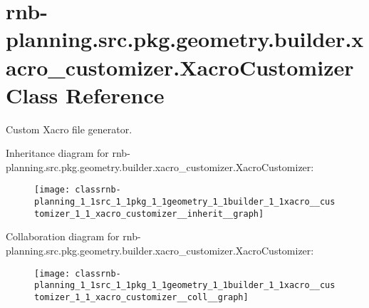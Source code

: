 \hypertarget{classrnb-planning_1_1src_1_1pkg_1_1geometry_1_1builder_1_1xacro__customizer_1_1_xacro_customizer}{}\section{rnb-\/planning.src.\+pkg.\+geometry.\+builder.\+xacro\+\_\+customizer.\+Xacro\+Customizer Class Reference}
\label{classrnb-planning_1_1src_1_1pkg_1_1geometry_1_1builder_1_1xacro__customizer_1_1_xacro_customizer}


Custom Xacro file generator.  




Inheritance diagram for rnb-\/planning.src.\+pkg.\+geometry.\+builder.\+xacro\+\_\+customizer.\+Xacro\+Customizer\+:
\nopagebreak
\begin{figure}[H]
\begin{center}
\leavevmode
\texttt{[image: classrnb-planning\_1\_1src\_1\_1pkg\_1\_1geometry\_1\_1builder\_1\_1xacro\_\_customizer\_1\_1\_xacro\_customizer\_\_inherit\_\_graph]}
\end{center}
\end{figure}


Collaboration diagram for rnb-\/planning.src.\+pkg.\+geometry.\+builder.\+xacro\+\_\+customizer.\+Xacro\+Customizer\+:
\nopagebreak
\begin{figure}[H]
\begin{center}
\leavevmode
\texttt{[image: classrnb-planning\_1\_1src\_1\_1pkg\_1\_1geometry\_1\_1builder\_1\_1xacro\_\_customizer\_1\_1\_xacro\_customizer\_\_coll\_\_graph]}
\end{center}
\end{figure}
